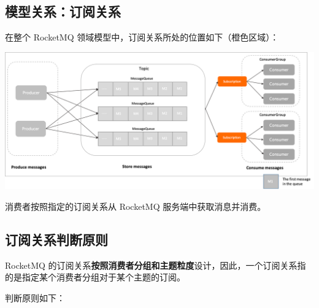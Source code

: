 \documentclass[11pt, a4paper, oneside, fontset=none]{ctexbook}
\begin{document}
\subsection{模型关系：订阅关系}
在整个 RocketMQ 领域模型中，订阅关系所处的位置如下（橙色区域）：

\begin{center}
  \begin{minipage}{\textwidth}
    \center
    \includegraphics[width=\textwidth]{picture/模型关系：订阅关系.png}
    \captionsetup{hypcap=false}
    \label{fig:模型关系：订阅关系}
  \end{minipage}
\end{center}

消费者按照指定的订阅关系从 RocketMQ 服务端中获取消息并消费。

\subsection{订阅关系判断原则}
RocketMQ 的订阅关系{\bfseries\kaishu 按照消费者分组和主题粒度}设计，因此，一个订阅关系指的是指定某个消费者分组对于某个主题的订阅。

判断原则如下：
\end{document}
